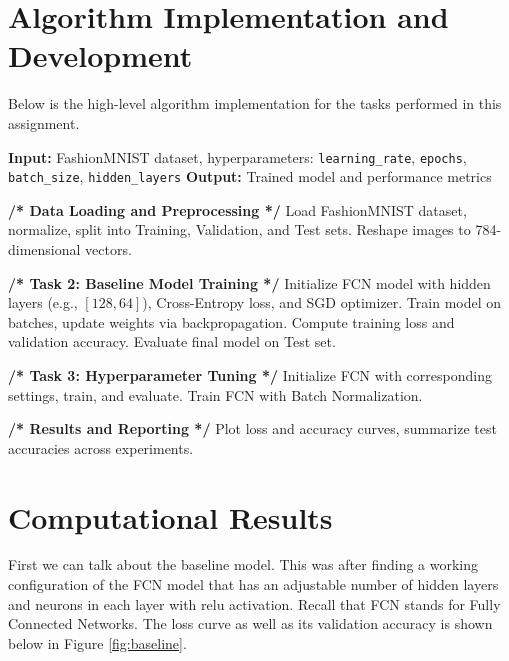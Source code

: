 \documentclass[11pt]{amsart}
\begin{document}
\section{Algorithm Implementation and Development}\label{sec:algorithms}
Below is the high-level algorithm implementation for the tasks performed in this assignment.
\begin{algorithm}[H]
    \caption{FCN Training and Hyperparameter Tuning for FashionMNIST}
    \begin{algorithmic}[1]
        \State \textbf{Input:} FashionMNIST dataset, hyperparameters: \texttt{learning\_rate}, \texttt{epochs}, \texttt{batch\_size}, \texttt{hidden\_layers}
        \State \textbf{Output:} Trained model and performance metrics
        
        \State \textbf{/* Data Loading and Preprocessing */}
        \State Load FashionMNIST dataset, normalize, split into Training, Validation, and Test sets.
        \State Reshape images to 784-dimensional vectors.
        
        \State \textbf{/* Task 2: Baseline Model Training */}
        \State Initialize FCN model with hidden layers (e.g., $[128, 64]$), Cross-Entropy loss, and SGD optimizer.
            \State Train model on batches, update weights via backpropagation.
            \State Compute training loss and validation accuracy.
        \EndFor
        \State Evaluate final model on Test set.
    
        \State \textbf{/* Task 3: Hyperparameter Tuning */}
            \State Initialize FCN with corresponding settings, train, and evaluate.
        \EndFor
        \State Train FCN with Batch Normalization.
    
        \State \textbf{/* Results and Reporting */}
        \State Plot loss and accuracy curves, summarize test accuracies across experiments.
    \end{algorithmic}
\end{algorithm}    

\section{Computational Results}\label{sec:results}

First we can talk about the baseline model. This was after finding a working configuration of the FCN model that has an adjustable number of hidden layers and neurons in each layer with relu activation. Recall that FCN stands for Fully Connected Networks. The loss curve as well as its validation accuracy is shown below in Figure \ref{fig:baseline}.
\end{document}
